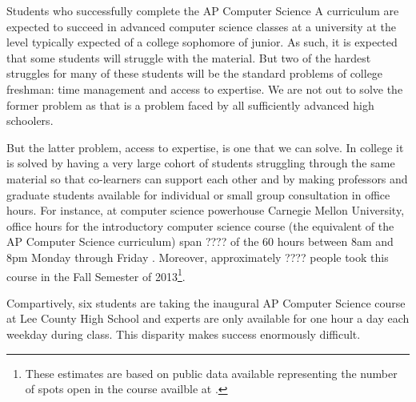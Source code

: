 Students who successfully complete the AP Computer Science A curriculum are
expected to succeed in advanced computer science classes at a university at
the level typically expected of a college sophomore of junior. As such, it is
expected that some students will struggle with the material. But two of the
hardest struggles for many of these students will be the standard problems
of college freshman: time management and access to expertise. We are not out
to solve the former problem as that is a problem faced by all sufficiently
advanced high schoolers.

But the latter problem, access to expertise, is one that we can solve. In
college it is solved by having a very large cohort of students struggling
through the same material so that co-learners can support each other and
by making professors and graduate students available for individual or small
group consultation in office hours. For instance, at computer science powerhouse
Carnegie Mellon University, office hours for the introductory computer science
course (the equivalent of the AP Computer Science curriculum) span ???? of the
60 hours between 8am and 8pm Monday through Friday \autocite{SomeCMUWebsite}.
Moreover, approximately ???? people took this course in the Fall Semester of
2013\footnote{These estimates are based on public data available representing
the number of spots open in the course availble at \autocite{CMUDirectory}.}.

Compartively, six students are taking the inaugural AP Computer Science course
at Lee County High School and experts are only available for one hour a day each
weekday during class. This disparity makes success enormously difficult.
